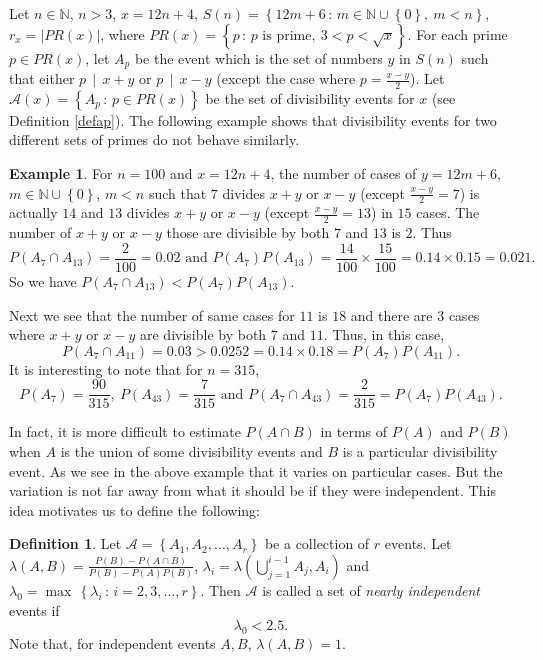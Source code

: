 \documentclass[11pt]{article}
\theoremstyle{definition}
\newtheorem{definition}[theorem]{Definition}
\newtheorem{example}[theorem]{Example}
\theoremstyle{remark}
\numberwithin{equation}{section}
\newcommand{\Nat}{\mathbb{N}}
\newcommand{\set}[1]{\left\{#1\right\}}
\newcommand{\Set}[2]{\set{#1\, :\, #2}}
\newcommand{\Div}[2]{#1\,\mid\, #2}
\begin{document}
\vspace{1em}
\noindent
Let $n\in\Nat$, $n>3$, $x=12n+4$, $S(n)=\Set{12m+6}{m\in\Nat\cup\set{0},\ m<n}$, $r_x=|PR(x)|$, where $PR(x)=\Set{p}{p \text{ is prime},\ 3<p<\sqrt{x}}$. For each prime $p\in PR(x)$, let $A_{p}$ be the event which is the set of numbers $y$ in $S(n)$ such that either $\Div{p}{x+y}$ or $\Div{p}{x-y}$ (except the case where $p=\frac{x-y}{2}$). Let $\mathscr{A}(x)=\Set{A_p}{p\in PR(x)}$ be the set of divisibility events for $x$ (see Definition \ref{defap}). The following example shows that divisibility events for two different sets of primes do not behave similarly.

\begin{example}
For $n=100$ and $x=12n+4$, the number of cases of $y=12m+6$, $m\in\Nat\cup\set{0}$, $m<n$ such that $7$ divides $x+y$ or $x-y$ (except $\frac{x-y}{2}=7$) is actually $14$ and $13$ divides $x+y$ or $x-y$ (except $\frac{x-y}{2}=13$) in $15$ cases. The number of $x+y$ or $x-y$ those are divisible by both $7$ and $13$ is $2$. Thus 
$$P(A_{7}\cap A_{13})=\frac{2}{100}=0.02 \text{ and } P(A_{7})P(A_{13})=\frac{14}{100}\times\frac{15}{100}=0.14\times 0.15=0.021.$$
So we have $P(A_{7}\cap A_{13})<P(A_{7})P(A_{13})$.

\vspace{1em}
\noindent
Next we see that the number of same cases for $11$ is $18$ and there are $3$ cases where $x+y$ or $x-y$ are divisible by both $7$ and $11$. Thus, in this case, 
$$P(A_7\cap A_{11})=0.03>0.0252=0.14\times 0.18=P(A_7)P(A_{11}).$$
It is interesting to note that for $n=315$, 
$$P(A_7)=\frac{90}{315},\ P(A_{43})=\frac{7}{315}\text{ and }P(A_7\cap A_{43})=\frac{2}{315}=P(A_7)P(A_{43}).$$
\end{example}

\noindent
In fact, it is more difficult to estimate $P(A\cap B)$ in terms of $P(A)$ and $P(B)$ when $A$ is the union of some divisibility events and $B$ is a particular divisibility event. As we see in the above example that it varies on particular cases. But the variation is not far away from what it should be if they were independent. This idea motivates us to define the following: 

\begin{definition}
Let $\mathscr{A}=\set{A_1,A_2,\ldots,A_r}$ be a collection of $r$ events. Let $\lambda (A,B)=\frac{P(B)-P(A\cap B)}{P(B)-P(A)P(B)}$, $\lambda_i=\lambda (\bigcup\limits_{j=1}^{i-1} A_j,A_i)$ and $\lambda_0=\max\,\Set{\lambda_i}{i=2,3,\ldots,r}$. Then $\mathscr{A}$ is called a set of {\em nearly independent} events if 
$$\lambda_0<2.5.$$
Note that, for independent events $A,B$, $\lambda (A,B)=1$. 
\end{definition}
\end{document}

